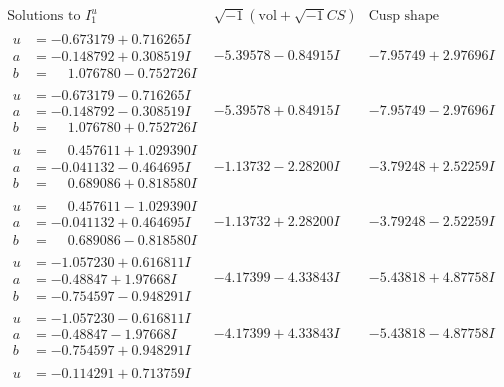 \documentclass[1p]{elsarticle_modified}
\theoremstyle{definition}
\newcommand{\I}{\sqrt{-1}}
\begin{document}
$$\begin{array}{c|c|c}  
\text{Solutions to }I^u_{1}& \I (\text{vol} + \sqrt{-1}CS) & \text{Cusp shape}\\
 \hline 
\begin{aligned}
u &= -0.673179 + 0.716265 I \\
a &= -0.148792 + 0.308519 I \\
b &= \phantom{-}1.076780 - 0.752726 I\end{aligned}
 & -5.39578 - 0.84915 I & -7.95749 + 2.97696 I \\ \hline\begin{aligned}
u &= -0.673179 - 0.716265 I \\
a &= -0.148792 - 0.308519 I \\
b &= \phantom{-}1.076780 + 0.752726 I\end{aligned}
 & -5.39578 + 0.84915 I & -7.95749 - 2.97696 I \\ \hline\begin{aligned}
u &= \phantom{-}0.457611 + 1.029390 I \\
a &= -0.041132 - 0.464695 I \\
b &= \phantom{-}0.689086 + 0.818580 I\end{aligned}
 & -1.13732 - 2.28200 I & -3.79248 + 2.52259 I \\ \hline\begin{aligned}
u &= \phantom{-}0.457611 - 1.029390 I \\
a &= -0.041132 + 0.464695 I \\
b &= \phantom{-}0.689086 - 0.818580 I\end{aligned}
 & -1.13732 + 2.28200 I & -3.79248 - 2.52259 I \\ \hline\begin{aligned}
u &= -1.057230 + 0.616811 I \\
a &= -0.48847 + 1.97668 I \\
b &= -0.754597 - 0.948291 I\end{aligned}
 & -4.17399 - 4.33843 I & -5.43818 + 4.87758 I \\ \hline\begin{aligned}
u &= -1.057230 - 0.616811 I \\
a &= -0.48847 - 1.97668 I \\
b &= -0.754597 + 0.948291 I\end{aligned}
 & -4.17399 + 4.33843 I & -5.43818 - 4.87758 I \\ \hline\begin{aligned}
u &= -0.114291 + 0.713759 I \\

\end{aligned}
\end{array}$$
\end{document}
